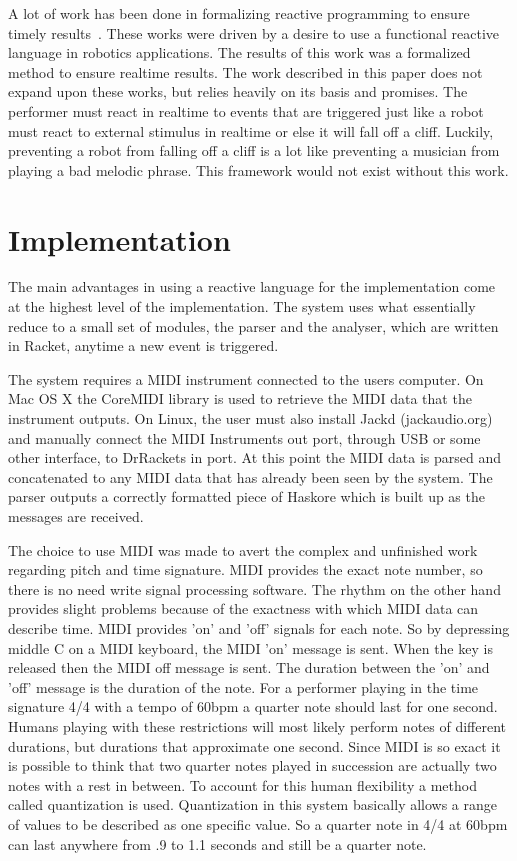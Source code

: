 \documentclass[12pt]{ucthesis}
\begin{document}
{A lot of work has been done in formalizing reactive programming to ensure timely results~\cite{EventDriven}\cite{RealTime}. These works were driven by a desire to use a functional reactive language in robotics applications. The results of this work was a formalized method to ensure realtime results. The work described in this paper does not expand upon these works, but relies heavily on its basis and promises. The performer must react in realtime to events that are triggered just like a robot must react to external stimulus in realtime or else it will fall off a cliff. Luckily, preventing a robot from falling off a cliff is a lot like preventing a musician from playing a bad melodic phrase. This framework would not exist without this work.

\chapter{Implementation}
\label{Implementation}
The main advantages in using a reactive language for the implementation come at the highest level of the implementation. The system uses what essentially reduce to a small set of modules, the parser and the analyser, which are written in Racket, anytime a new event is triggered. 

The system requires a MIDI instrument connected to the users computer. On Mac OS X the CoreMIDI library is used to retrieve the MIDI data that the instrument outputs. On Linux, the user must also install Jackd (jackaudio.org) and manually connect the MIDI Instruments out port, through USB or some other interface, to DrRackets in port. At this point the MIDI data is parsed and concatenated to any MIDI data that has already been seen by the system. The parser outputs a correctly formatted piece of Haskore which is built up as the messages are received. 

The choice to use MIDI was made to avert the complex and unfinished work regarding pitch and time signature. MIDI provides the exact note number, so there is no need write signal processing software. The rhythm on the other hand provides slight problems because of the exactness with which MIDI data can describe time. MIDI provides 'on' and 'off' signals for each note. So by depressing middle C on a MIDI keyboard, the MIDI 'on' message is sent. When the key is released then the MIDI off message is sent. The duration between the 'on' and 'off' message is the duration of the note. For a performer playing in the time signature 4/4 with a tempo of 60bpm a quarter note should last for one second. Humans playing with these restrictions will most likely perform notes of different durations, but durations that approximate one second. Since MIDI is so exact it is possible to think that two quarter notes played in succession are actually two notes with a rest in between. To account for this human flexibility a method called quantization is used. Quantization in this system basically allows a range of values to be described as one specific value. So a quarter note in 4/4 at 60bpm can last anywhere from .9 to 1.1 seconds and still be a quarter note. 

}
\end{document}
